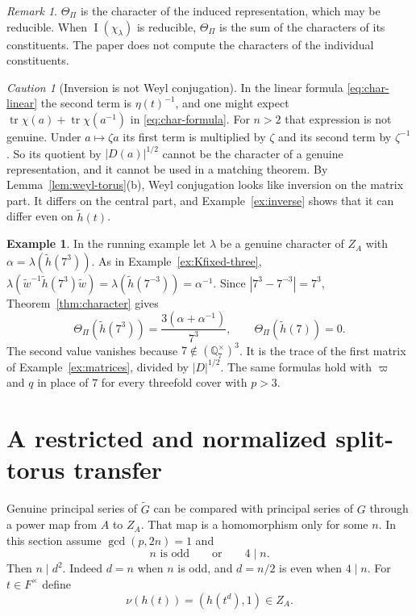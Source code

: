 \documentclass[12pt,letterpaper]{article}
\numberwithin{equation}{section}
\theoremstyle{plain}
\theoremstyle{definition}
\newtheorem{example}[theorem]{Example}
\theoremstyle{remark}
\newtheorem{remark}[theorem]{Remark}
\newtheorem{warning}[theorem]{Caution}
\newcommand{\Gt}{\widetilde G}
\newcommand{\hl}{\tilde h}
\newcommand{\wt}{\tilde w}
\newcommand{\Qq}{\mathbb Q}
\newcommand{\ZA}{Z_A}
\DeclareMathOperator{\PI}{I}
\DeclareMathOperator{\tr}{tr}
\begin{document}
\begin{remark}\label{rem:reducible-character}
$\Theta_\Pi$ is the character of the induced representation, which may
be reducible. When $\PI(\chi_\lambda)$ is reducible, $\Theta_\Pi$ is the
sum of the characters of its constituents. The paper does not compute
the characters of the individual constituents.
\end{remark}

\begin{warning}[Inversion is not Weyl conjugation]\label{caution:inverse}
In the linear formula \eqref{eq:char-linear} the second term is
$\eta(t)^{-1}$, and one might expect $\tr\chi(a)+\tr\chi(a^{-1})$ in
\eqref{eq:char-formula}. For $n>2$ that expression is not genuine.
Under $a\mapsto\zeta a$ its first term is multiplied by $\zeta$ and its
second term by $\zeta^{-1}$. So its quotient by $|D(a)|^{1/2}$ cannot be
the character of a genuine representation, and it cannot be used in a
matching theorem. By Lemma~\ref{lem:weyl-torus}(b), Weyl conjugation
looks like inversion on the matrix part. It differs on the central
part, and Example~\ref{ex:inverse} shows that it can differ even on
$\hl(t)$.
\end{warning}

\begin{example}\label{ex:char-three}
In the running example let $\lambda$ be a genuine character of $\ZA$
with $\alpha=\lambda(\hl(7^3))$. As in Example~\ref{ex:Kfixed-three},
$\lambda(\wt^{-1}\hl(7^3)\wt)=\lambda(\hl(7^{-3}))=\alpha^{-1}$. Since
$|7^3-7^{-3}|=7^3$, Theorem~\ref{thm:character} gives
\[
\Theta_\Pi(\hl(7^3))=\frac{3(\alpha+\alpha^{-1})}{7^3},\qquad
\Theta_\Pi(\hl(7))=0 .
\]
The second value vanishes because $7\notin(\Qq_7^\times)^3$. It is the
trace of the first matrix of Example~\ref{ex:matrices}, divided by
$|D|^{1/2}$. The same formulas hold with $\varpi$ and $q$ in place of
$7$ for every threefold cover with $p>3$.
\end{example}

\section{A restricted and normalized split-torus transfer}
\label{sec:transfer}

Genuine principal series of $\Gt$ can be compared with principal
series of $G$ through a power map from $A$ to $\ZA$. That map is a
homomorphism only for some $n$. In this section assume
$\gcd(p,2n)=1$ and
\begin{equation}\label{eq:restriction}
n\text{ is odd}\qquad\text{or}\qquad 4\mid n .
\end{equation}
Then $n\mid d^2$. Indeed $d=n$ when $n$ is odd, and $d=n/2$ is even
when $4\mid n$. For $t\in F^\times$ define
\begin{equation}\label{eq:nu}
\nu(h(t))=(h(t^d),1)\in\ZA .
\end{equation}
\end{document}

